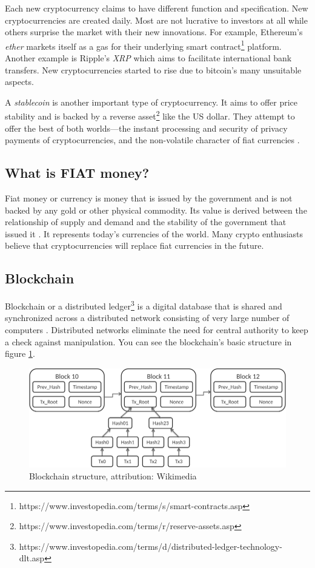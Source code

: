 Each new cryptocurrency claims to have different function and specification. New cryptocurrencies are created daily. Most are not lucrative to investors at all while others surprise the market with their new innovations. For example, Ethereum's \emph{ether} markets itself as a gas for their underlying smart contract\footnote{https://www.investopedia.com/terms/s/smart-contracts.asp} platform. Another example is Ripple's \emph{XRP} which aims to facilitate international bank transfers. New cryptocurrencies started to rise due to bitcoin's many unsuitable aspects.

\label{stablecoins-ref}
A \emph{stablecoin} is another important type of cryptocurrency. It aims to offer price stability and is backed by a reverse asset\footnote{https://www.investopedia.com/terms/r/reserve-assets.asp} like the US dollar. They attempt to offer the best of both worlds---the instant processing and security of privacy payments of cryptocurrencies, and the non-volatile character of fiat currencies \cite{investopedia-stablecoin}.

\subsection*{What is FIAT money?}
﻿Fiat money or currency is money that is issued by the government and is not backed by any gold or other physical commodity. Its value is derived between the relationship of supply and demand and the stability of the government that issued it \cite{investopedia-fiat}. It represents today's currencies of the world. Many crypto enthusiasts believe that cryptocurrencies will replace fiat currencies in the future.

\subsection*{Blockchain}
\label{blockchain}
Blockchain or a distributed ledger\footnote{https://www.investopedia.com/terms/d/distributed-ledger-technology-dlt.asp} is a digital database that is shared and synchronized across a distributed network consisting of very large number of computers \cite{investopedia-blockchain}. Distributed networks eliminate the need for central authority to keep a check against manipulation. You can see the blockchain's basic structure in figure \ref{blockchain-figure}.

\begin{figure}[ht]
    \centering
    \includegraphics[width=\columnwidth]{figures/Bitcoin_Block_Data.png}
    \caption{Blockchain structure, attribution: Wikimedia}
    \label{blockchain-figure}
\end{figure}

